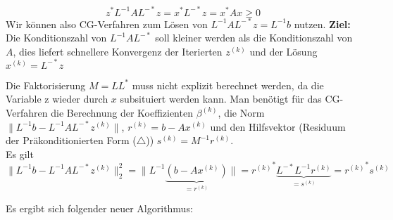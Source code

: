 \documentclass{article}
\begin{document}
    \[z^*L^{-1}AL^{-*}z = x^*L^{-*}z = x^*Ax \geq 0\]
    Wir können also CG-Verfahren zum Lösen von $L^{-1}AL^{-*}z = L^{-1}b$ nutzen.
    \textbf{Ziel:} Die Konditionszahl von $L^{-1}AL^{-*}$ soll kleiner werden als die Konditionszahl von $A$, dies 
    liefert schnellere Konvergenz der Iterierten $z^{(k)}$ und der Lösung $x^{(k)}=L^{-*}z$ 
    \newpage
    \begin{rembox}
        Die Faktorisierung $M=LL^*$ muss nicht explizit berechnet werden, 
        da die Variable z wieder durch $x$ subsituiert werden kann.
        Man benötigt für das CG-Verfahren die Berechnung der Koeffizienten $\beta^{(k)}$, 
        die Norm $\|L^{-1}b-L^{-1}AL^{-*}z^{(k)}\|$, $r^{(k)} = b-Ax^{(k)}$ und den Hilfsvektor 
        (Residuum der Präkonditionierten Form ({\scriptsize$\triangle$})) $s^{(k)} = M^{-1}r^{(k)}$. \\
        Es gilt 
        \[\|L^{-1}b-L^{-1}AL^{-*}z^{(k)}\|_2^2 = \|L^{-1}\underbrace{(b-Ax^{(k)})}_{=r^{(k)}}\| = 
        {r^{(k)}}^*\underbrace{L^{-*}L^{-1}r^{(k)}}_{=s^{(k)}} = {r^{(k)}}^*s^{(k)}\]
    \end{rembox}
    Es ergibt sich folgender neuer Algorithmus: \\ \\
\end{document}

